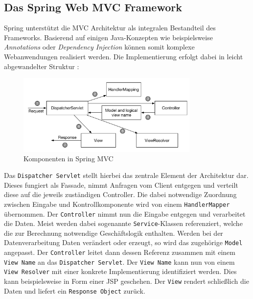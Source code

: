 \subsection{Das Spring Web MVC Framework}
Spring unterstützt die \acs{MVC} Architektur als integralen Bestandteil des Frameworks. Basierend auf einigen Java-Konzepten wie beispielsweise \textit{Annotations} oder \textit{Dependency Injection} können somit komplexe Webanwendungen realisiert werden. Die Implementierung erfolgt dabei in leicht abgewandelter Struktur \cite{walls:2011} : \\
\begin{figure}[bth] 
  \centering
  \includegraphics[width=0.8\textwidth]{Graphics/spring_mvc}
  \caption{Komponenten in Spring MVC}
\end{figure}
\newpage
Das \texttt{Dispatcher Servlet} stellt hierbei das zentrale Element der Architektur dar. Dieses fungiert als Fassade, nimmt Anfragen vom Client entgegen und verteilt diese auf die jeweils zuständigen Controller. Die dabei notwendige Zuordnung zwischen Eingabe und Kontrollkomponente wird von einem \texttt{HandlerMapper} übernommen. Der \texttt{Controller} nimmt nun die Eingabe entgegen und verarbeitet die Daten. Meist werden dabei sogenannte \texttt{Service}-Klassen referenziert, welche die zur Berechnung notwendige Geschäftslogik enthalten. Werden bei der Datenverarbeitung Daten verändert oder erzeugt, so wird das zugehörige \texttt{Model} angepasst. Der \texttt{Controller} leitet dann dessen Referenz zusammen mit einem \texttt{View Name} an das \texttt{Dispatcher Servlet}. Der \texttt{View Name} kann nun von einem \texttt{View Resolver} mit einer konkrete Implementierung identifiziert werden. Dies kann beispielsweise in Form einer \acs{JSP} geschehen. Der \texttt{View} rendert schließlich die Daten und liefert ein \texttt{Response Object} zurück.\\\\

